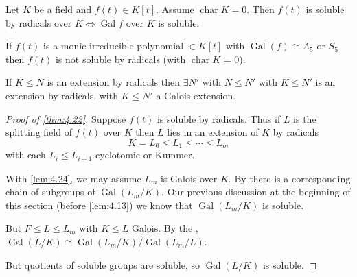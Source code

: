 \documentclass{article}
\DeclareMathOperator{\chara}{char}
\DeclareMathOperator{\Gal}{Gal}
\begin{document}
\begin{nthm}\label{thm:4.22}
    Let $K$ be a field and $f(t) \in K[t]$.
    Assume $\chara K= 0$. Then $f(t)$ is soluble by radicals over $K \iff \Gal f$ over $K$ is soluble.
\end{nthm}

\begin{ncor}\label{cor:4.23}
    If $f(t)$ is a monic irreducible polynomial $\in K[t]$ with $\Gal(f) \cong A_5$ or $S_5$ then $f(t)$ is not soluble by radicals (with $\chara K$ = 0).
\end{ncor}

\begin{nlemma}\label{lem:4.24}
    If $K \leq N$ is an extension by radicals then $\exists N'$ with $N \leq N'$ with $K \leq N'$ is an extension by radicals, with $K \leq N'$ a Galois extension.
\end{nlemma}
\begin{proof}[Proof of \cref{thm:4.22}]
    Suppose $f(t)$ is soluble by radicals.
    Thus if $L$ is the splitting field of $f(t)$ over $K$ then $L$ lies in an extension of $K$ by radicals
    \begin{equation*}
        K = L_0 \leq L_1 \leq \dotsb \leq L_m
    \end{equation*}
    with each $L_i \leq L_{i+1}$ cyclotomic or Kummer.

    With \cref{lem:4.24}, we may assume $L_m$ is Galois over $K$.
    By  there is a corresponding chain of subgroups of $\Gal(L_m/K)$.
    Our previous discussion at the beginning of this section (before \cref{lem:4.13}) we know that $\Gal(L_m/K)$ is soluble.

    But $F \leq L \leq L_m$ with $K \leq L$ Galois.
    By the , $\Gal(L/K) \cong \Gal(L_m/K)/\Gal(L_m/L)$.

    But quotients of soluble groups are soluble, so $\Gal(L/K)$ is soluble.
\end{proof}
\end{document}
